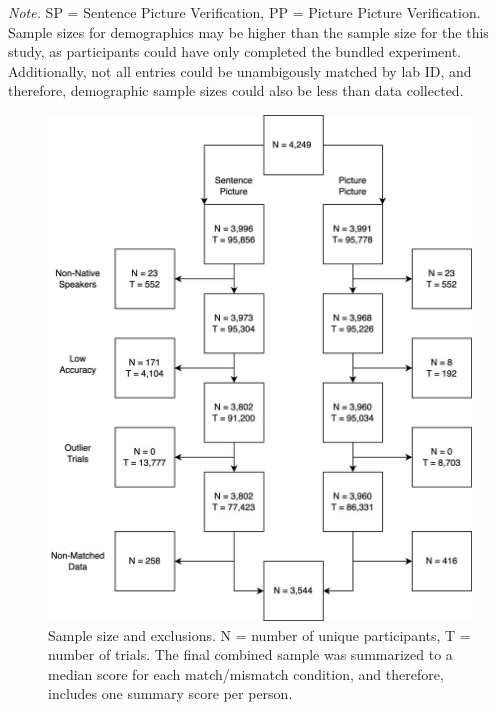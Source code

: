 \documentclass[
  man,mask,floatsintext]{apa7}
\begin{document}
\begin{table}[tbp]
\begin{center}
\begin{threeparttable}
{}

\begin{tablenotes}[para]
\normalsize{\textit{Note.} SP = Sentence Picture Verification, PP = Picture Picture Verification. Sample sizes for demographics may be higher than the sample size for the this study, as participants could have only completed the bundled experiment. Additionally, not all entries could be unambigously matched by lab ID, and therefore, demographic sample sizes could also be less than data collected.}
\end{tablenotes}

\end{threeparttable}
\end{center}

\end{table}

\begin{figure}
\includegraphics[width=5.71in]{includes/fig/psa002_flow.drawio} \caption{Sample size and exclusions. N = number of unique participants, T = number of trials. The final combined sample was summarized to a median score for each match/mismatch condition, and therefore, includes one summary score per person.}\label{fig:sample-fig}
\end{figure}
\end{document}
